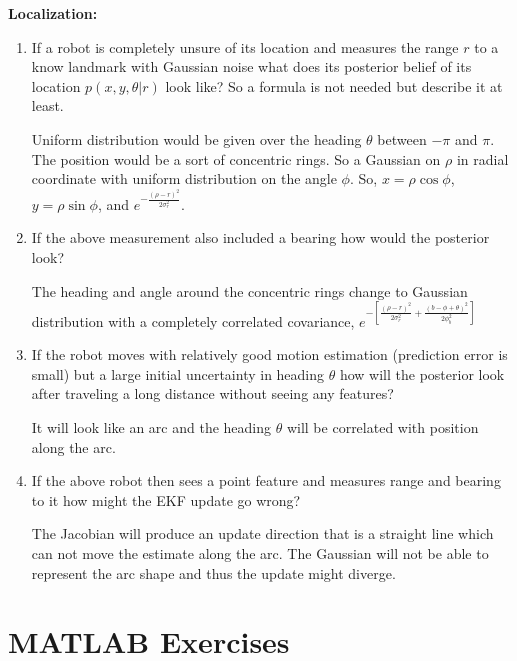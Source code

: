 \documentclass[11pt,a4paper]{article}
\begin{document}
\par \textbf{Localization:}
\begin{enumerate}
	\item \addtocounter{cnt_questions}{1} If a robot is completely unsure of its location and measures the range $r$ to a know landmark with Gaussian noise what does its posterior belief of its location $p(x,y,\theta|r)$ look like? So a formula is not needed but describe it at least.
		\par Uniform distribution would be given over the heading $\theta$ between $-\pi$ and $\pi$. The position would be a sort of concentric rings. So a Gaussian on $\rho$ in radial coordinate with uniform distribution on the angle $\phi$. So, $x = \rho\cos\phi$, $y = \rho\sin\phi$, and $e^{-\frac{(\rho - r)^{2}}{2\sigma_{r}^{2}}}$.

	\item \addtocounter{cnt_questions}{1} If the above measurement also included a bearing how would the posterior look?
		\par The heading and angle around the concentric rings change to Gaussian distribution with a completely correlated covariance, $e^{-\left[\frac{(\rho-r)^{2}}{2\sigma_{r}^{2}} + \frac{(b-\phi+\theta)^{2}}{2\phi_{b}^{2}}\right]}$

	\item \addtocounter{cnt_questions}{1} If the robot moves with relatively good motion estimation (prediction error is small) but a large initial uncertainty in heading $\theta$ how will the posterior look after traveling a long distance without seeing any features?
		\par It will look like an arc and the heading $\theta$ will be correlated with position along the arc.

	\item \addtocounter{cnt_questions}{1} If the above robot then sees a point feature and measures range and bearing to it how might the EKF update go wrong?
		\par The Jacobian will produce an update direction that is a straight line which can not move the estimate along the arc. The Gaussian will not be able to represent the arc shape and thus the update might diverge.
\end{enumerate}

\setcounter{cnt_questions}{0}
\section{MATLAB Exercises}
\end{document}
